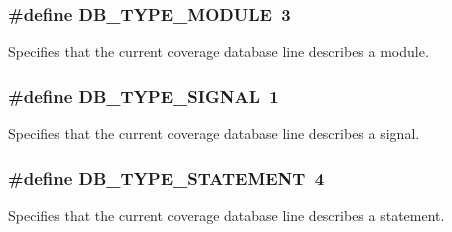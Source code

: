\subsubsection{\setlength{\rightskip}{0pt plus 5cm}\#define DB\_\-TYPE\_\-MODULE\ 3}\label{group__db__types_a2}


Specifies that the current coverage database line describes a module. 
\subsubsection{\setlength{\rightskip}{0pt plus 5cm}\#define DB\_\-TYPE\_\-SIGNAL\ 1}\label{group__db__types_a0}


Specifies that the current coverage database line describes a signal. 
\subsubsection{\setlength{\rightskip}{0pt plus 5cm}\#define DB\_\-TYPE\_\-STATEMENT\ 4}\label{group__db__types_a3}


Specifies that the current coverage database line describes a statement. 